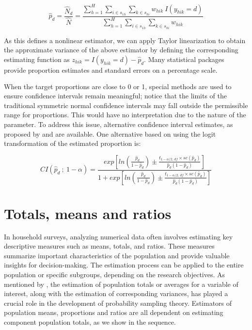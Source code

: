 \documentclass[
  12pt,
]{book}
\begin{document}
\[
\widehat{p}_d = \frac{\widehat{N}_d}{\widehat{N}} = \frac{\sum_{h=1}^{H}\sum_{i \in s_{1h}} \sum_{ k \in s_{hi}} w_{hik}\ I(y_{hik} = d)} {\sum_{h=1}^{H}\sum_{i \in s_{1h}} \sum_{ k \in s_{hi}} w_{hik}}
\]

As this defines a nonlinear estimator, we can apply Taylor linearization to obtain the approximate variance of the above estimator by defining the corresponding estimating function as \(z_{hik} = I(y_{hik} = d) - \widehat{p}_d\). Many statistical packages provide proportion estimates and standard errors on a percentage scale.

When the target proportions are close to 0 or 1, special methods are used to ensure confidence intervals remain meaningful; notice that the limits of the traditional symmetric normal confidence intervals may fall outside the permissible range for proportions. This would have no interpretation due to the nature of the parameter. To address this issue, alternative confidence interval estimates, as proposed by \citet{Rust2007ConfidenceIF} and \citet{DeanPagano2015} are available. One alternative based on using the logit transformation of the estimated proportion is:

\[
CI \left( \widehat{p}_d \ ; \ 1 - \alpha \right) = \frac {exp \left[ ln \left( \frac{\widehat{p}_d} {1 - \widehat{p}_d} \right) \pm \frac{t_{1-\alpha/2 , \, df} \times se \left( \widehat{p}_d \right)} {\widehat{p}_d \left( 1 - \widehat{p}_d \right) } \right]} {1 + exp \left[ ln \left( \frac{\widehat{p}_d} {1 - \widehat{p}_d} \right) \pm \frac{t_{1-\alpha/2, \, df} \times se \left( \widehat{p}_d \right)} {\widehat{p}_d \left( 1 - \widehat{p}_d \right)}\right]}
\]

\hypertarget{totals-means-and-ratios}{%
\section{Totals, means and ratios}\label{totals-means-and-ratios}}

In household surveys, analyzing numerical data often involves estimating key descriptive measures such as means, totals, and ratios. These measures summarize important characteristics of the population and provide valuable insights for decision-making. The estimation process can be applied to the entire population or specific subgroups, depending on the research objectives. As mentioned by \citet{Heeringa_West_Berglund_2017}, the estimation of population totals or averages for a variable of interest, along with the estimation of corresponding variances, has played a crucial role in the development of probability sampling theory. Estimators of population means, proportions and ratios are all dependent on estimating component population totals, as we show in the sequence.
\end{document}
